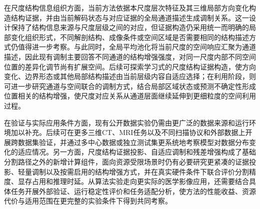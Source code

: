 在尺度结构信息组织方面，当前方法依据本尺度层次特征及其三维局部方向变化构造结构证据，并由当前解码状态与对应证据的全局通道描述生成调制关系。这一设计保持了结构信息来源与尺度层级之间的对应，但证据构造仍采用统一而明确的局部变化组织形式，不同解剖结构、成像条件或空间区域是否需要相同的结构描述方式仍值得进一步考察。与此同时，全局平均池化将当前尺度的空间响应汇聚为通道描述，因此现有调制主要回答不同通道的结构增强强度，对同一尺度内部不同空间位置的差异化调节尚有扩展空间。后续可探索学习式的尺度结构证据构造，使方向变化、边界形态或其他局部结构描述由当前层级内容自适应选择；在利用阶段，则可进一步研究通道与空间联合的调制方式，结合局部区域状态或预测不确定性形成位置相关的结构增强，使尺度对应关系从通道层面继续延伸到更细粒度的空间利用过程。

在验证与实际应用条件方面，现有公开数据实验仍需由更广泛的数据来源和运行环境加以补充。后续可在更多三维CT、MRI任务以及不同扫描协议和外部数据上开展跨数据集验证，并通过多中心数据或独立测试集更系统地考察模型对数据分布变化的适应情况。另一方面，尺度结构证据投影、自适应调制和残差增强构成了基础分割路径之外的新增计算组件，面向资源受限场景时仍有必要研究更紧凑的证据投影、轻量调制以及按需启用的结构增强方式，并在真实硬件条件下联合评价分割精度、显存占用和推理时延。从算法实验走向更实际的医学影像应用，还需要结合具体任务开展外部验证、运行稳定性评价和任务适配分析，使方法的性能收益、资源代价与适用范围在更完整的实验条件下得到共同考察。
